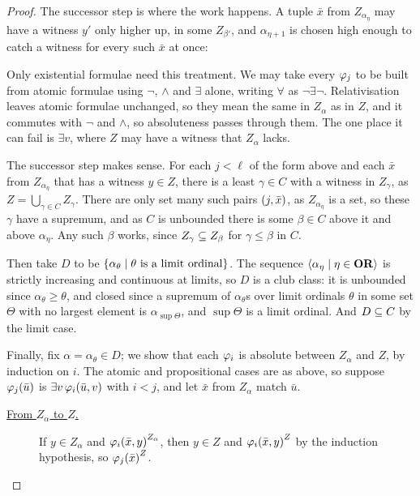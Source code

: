 \begin{proof}
    The successor step is where the work happens. A tuple $\bar{x}$ from $Z_{\alpha_{\eta}}$ may have a witness $y'$ only higher up, in some $Z_{\beta'}$, and $\alpha_{\eta + 1}$ is chosen high enough to catch a witness for every such $\bar{x}$ at once:
    \begin{figure}[H]
        \centering
    \end{figure}
    Only existential formulae need this treatment. We may take every $\varphi_j$ to be built from atomic formulae using $\neg$, $\land$ and $\exists$ alone, writing $\forall$ as $\neg \exists \neg$. Relativisation leaves atomic formulae unchanged, so they mean the same in $Z_{\alpha}$ as in $Z$, and it commutes with $\neg$ and $\land$, so absoluteness passes through them. The one place it can fail is $\exists v$, where $Z$ may have a witness that $Z_{\alpha}$ lacks.

    The successor step makes sense. For each $j < \ell$ of the form above and each $\bar{x}$ from $Z_{\alpha_{\eta}}$ that has a witness $y \in Z$, there is a least $\gamma \in C$ with a witness in $Z_{\gamma}$, as $Z = \bigcup_{\gamma \in C} Z_{\gamma}$. There are only set many such pairs $\left( j, \bar{x} \right)$, as $Z_{\alpha_{\eta}}$ is a set, so these $\gamma$ have a supremum, and as $C$ is unbounded there is some $\beta \in C$ above it and above $\alpha_{\eta}$. Any such $\beta$ works, since $Z_{\gamma} \subseteq Z_{\beta}$ for $\gamma \leq \beta$ in $C$.

    Then take $D$ to be $\left\{ \alpha_{\theta} \; \middle\vert \; \theta \text{ is a limit ordinal} \right\}$. The sequence $\left\langle \alpha_{\eta} \; \middle| \; \eta \in \mathbf{OR} \right\rangle$ is strictly increasing and continuous at limits, so $D$ is a club class: it is unbounded since $\alpha_{\theta} \geq \theta$, and closed since a supremum of $\alpha_{\theta}$s over limit ordinals $\theta$ in some set $\Theta$ with no largest element is $\alpha_{\sup \Theta}$, and $\sup \Theta$ is a limit ordinal. And $D \subseteq C$ by the limit case.

    Finally, fix $\alpha = \alpha_{\theta} \in D$; we show that each $\varphi_i$ is absolute between $Z_{\alpha}$ and $Z$, by induction on $i$. The atomic and propositional cases are as above, so suppose $\varphi_j\!\left( \bar{u} \right)$ is $\exists v \, \varphi_i\!\left( \bar{u}, v \right)$ with $i < j$, and let $\bar{x}$ from $Z_{\alpha}$ match $\bar{u}$.
    \begin{description}
        \item[\underline{From $Z_{\alpha}$ to $Z$.}] If $y \in Z_{\alpha}$ and $\varphi_i\!\left( \bar{x}, y \right)^{Z_{\alpha}}$, then $y \in Z$ and $\varphi_i\!\left( \bar{x}, y \right)^Z$ by the induction hypothesis, so $\varphi_j\!\left( \bar{x} \right)^Z$.


\end{description}
\end{proof}
